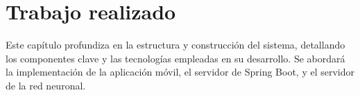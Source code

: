 \chapter{Trabajo realizado}

Este capítulo profundiza en la estructura y construcción del sistema, detallando los componentes clave y las tecnologías empleadas en su desarrollo. Se abordará la implementación de la aplicación móvil, el servidor de Spring Boot, y el servidor de la red neuronal.





\newpage



\newpage



\newpage






